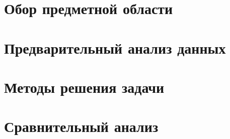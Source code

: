 \documentclass[a4paper,14pt,russian]{extreport}
\begin{document}
\tableofcontents
\newpage



\chapter{Обор предметной области}


\chapter{Предварительный анализ данных}


\chapter{Методы решения задачи}


\chapter{Сравнительный анализ}


\newpage
{}




\newpage

\end{document}
